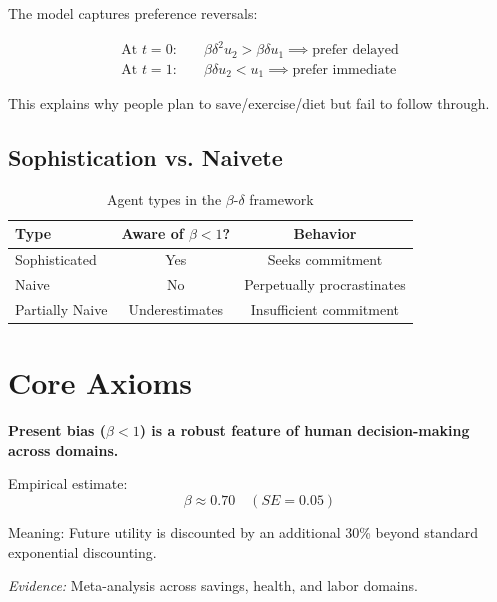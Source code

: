 The model captures preference reversals:

\begin{align}
\text{At } t=0: \quad & \beta\delta^2 u_2 > \beta\delta u_1 \implies \text{prefer delayed} \\
\text{At } t=1: \quad & \beta\delta u_2 < u_1 \implies \text{prefer immediate}
\end{align}

This explains why people plan to save/exercise/diet but fail to follow through.

\subsection{Sophistication vs. Naivete}

\begin{table}[h]
\centering
\begin{tabular}{lcc}
\hline
\textbf{Type} & \textbf{Aware of $\beta < 1$?} & \textbf{Behavior} \\
\hline
Sophisticated & Yes & Seeks commitment \\
Naive & No & Perpetually procrastinates \\
Partially Naive & Underestimates & Insufficient commitment \\
\hline
\end{tabular}
\caption{Agent types in the $\beta$-$\delta$ framework}
\end{table}

\section{Core Axioms}

\begin{tcolorbox}[colback=red!5!white,colframe=red!75!black,title=Axiom LA-1: Present Bias Universality]
\textbf{Present bias ($\beta < 1$) is a robust feature of human decision-making across domains.}

Empirical estimate:
\begin{equation}
\beta \approx 0.70 \quad (SE = 0.05)
\end{equation}

Meaning: Future utility is discounted by an additional 30\% beyond standard exponential discounting.

\textit{Evidence:} Meta-analysis across savings, health, and labor domains.
\end{tcolorbox}

